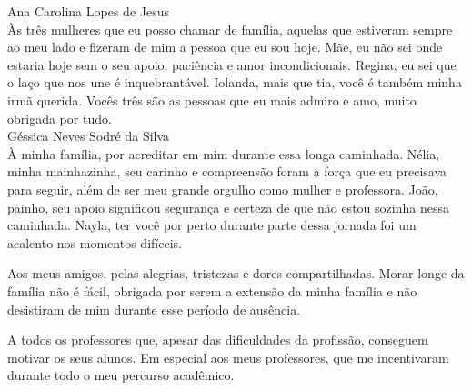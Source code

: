 Ana Carolina Lopes de Jesus
\\

Às três mulheres que eu posso chamar de família, aquelas que estiveram sempre ao meu lado e fizeram de mim a pessoa que eu sou hoje. Mãe, eu não sei onde estaria hoje sem o seu apoio, paciência e amor incondicionais. Regina, eu sei que o laço que nos une é inquebrantável. Iolanda, mais que tia, você é também minha irmã querida. Vocês três são as pessoas que eu mais admiro e amo, muito obrigada por tudo.
\\

\noindent
Géssica Neves Sodré da Silva
\\

À minha família, por acreditar em mim durante essa longa caminhada. Nélia, minha mainhazinha, seu carinho e compreensão foram a força que eu precisava para seguir, além de ser meu grande orgulho como mulher e professora. João, painho, seu apoio significou segurança e certeza de que não estou sozinha nessa caminhada. Nayla, ter você por perto durante parte dessa jornada foi um acalento nos momentos difíceis.

Aos meus amigos, pelas alegrias, tristezas e dores compartilhadas. Morar longe da família não é fácil, obrigada por serem a extensão da minha família e não desistiram de mim durante esse período de ausência.

A todos os professores que, apesar das dificuldades da profissão, conseguem motivar os seus alunos. Em especial aos meus professores, que me incentivaram durante todo o meu percurso acadêmico.